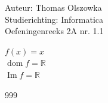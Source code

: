\documentclass[a4paper]{article}
\begin{document}
\noindent \large Auteur: Thomas Olszowka \\
\noindent \large Studierichting: Informatica\\
\noindent \large Oefeningenreeks 2A nr. 1.1\\

\medskip

\normalsize

$f(x) = x$ \\

$\operatorname{dom}f = \mathbb{R}$ \\

$\operatorname{Im}f = \mathbb{R}$ \\

\begin{thebibliography}{999}
\end{thebibliography}
\end{document}

